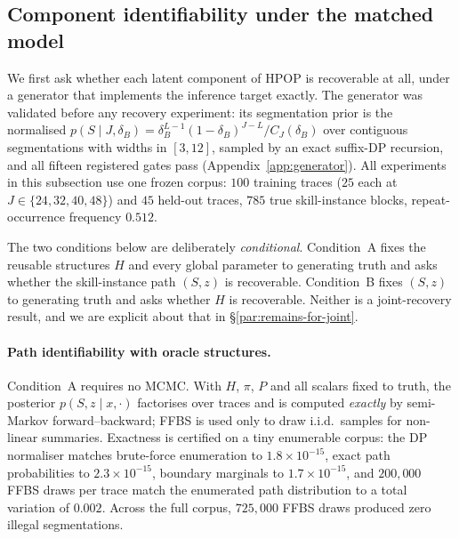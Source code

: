 %

\subsection{Component identifiability under the matched model}
\label{sec:matched-synthetic-ab}

We first ask whether each latent component of HPOP is recoverable at all, under
a generator that implements the inference target exactly. The generator was
validated before any recovery experiment: its segmentation prior is the
normalised
$p(S \mid J, \delta_B) = \delta_B^{L-1}(1-\delta_B)^{J-L} / C_J(\delta_B)$
over contiguous segmentations with widths in $[3,12]$, sampled by an exact
suffix-DP recursion, and all fifteen registered gates pass
(Appendix~\ref{app:generator}). All experiments in this subsection use one
frozen corpus: $100$ training traces ($25$ each at $J \in \{24,32,40,48\}$) and
$45$ held-out traces, $785$ true skill-instance blocks, repeat-occurrence
frequency $0.512$.

The two conditions below are deliberately \emph{conditional}. Condition~A fixes
the reusable structures $H$ and every global parameter to generating truth and
asks whether the skill-instance path $(S, z)$ is recoverable. Condition~B fixes
$(S,z)$ to generating truth and asks whether $H$ is recoverable. Neither is a
joint-recovery result, and we are explicit about that in
\S\ref{par:remains-for-joint}.

\paragraph{Path identifiability with oracle structures.}
Condition~A requires no MCMC. With $H$, $\pi$, $P$ and all scalars fixed to
truth, the posterior $p(S, z \mid x, \cdot)$ factorises over traces and is
computed \emph{exactly} by semi-Markov forward--backward; FFBS is used only to
draw i.i.d.\ samples for non-linear summaries. Exactness is certified on a tiny
enumerable corpus: the DP normaliser matches brute-force enumeration to
$1.8\times10^{-15}$, exact path probabilities to $2.3\times10^{-15}$, boundary
marginals to $1.7\times10^{-15}$, and $200{,}000$ FFBS draws per trace match the
enumerated path distribution to a total variation of $0.002$. Across the full
corpus, $725{,}000$ FFBS draws produced zero illegal segmentations.

